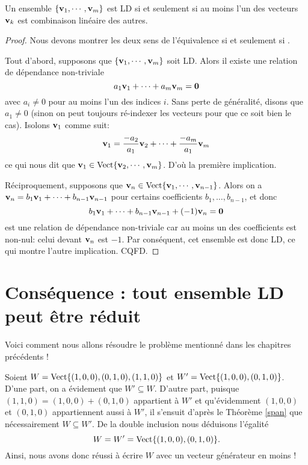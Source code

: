 \begin{theorem}\label{depspan} 
Un ensemble $\{\mathbf{v}_1, \cdots, \mathbf{v}_m\}$ est LD si et seulement si au moins
l'un des vecteurs $\mathbf{v}_k$ est combinaison lin\'eaire des autres.
\end{theorem}


\begin{proof}
Nous devons montrer les deux sens de l'\'equivalence \og si et seulement si \fg.

Tout d'abord, supposons que $\{\mathbf{v}_1, \cdots, \mathbf{v}_m\}$ soit LD.  Alors il existe
une relation de dépendance non-triviale
$$
a_1\mathbf{v}_1 + \cdots + a_m\mathbf{v}_m = \mathbf{0}
$$
avec $a_i \neq 0$ pour au moins l'un des indices $i$. Sans perte de généralité, disons que $a_1 \neq 0$ (sinon on peut toujours
r\'e-indexer les vecteurs pour que ce soit bien le cas).  Isolons $\mathbf{v}_1$ comme suit:
$$
\mathbf{v}_1 = \frac{-a_2}{a_1}\mathbf{v}_2 + \cdots + \frac{-a_m}{a_1}\mathbf{v}_m
$$
ce qui nous dit que $\mathbf{v}_1 \in \textrm{Vect}\{ \mathbf{v}_2, \cdots, \mathbf{v}_m\}$.   D'où la première implication.

R\'eciproquement, supposons que $\mathbf{v}_n \in \textrm{Vect}\{ \mathbf{v}_1, \cdots, \mathbf{v}_{n-1}\}$.
Alors on a $\mathbf{v}_n = b_1\mathbf{v}_1 + \cdots + b_{n-1}\mathbf{v}_{n-1}$ pour certains coefficients $b_1,\dots, b_{n-1}$, et donc
$$
b_1\mathbf{v}_1 + \cdots + b_{n-1}\mathbf{v}_{n-1} + (-1)\mathbf{v}_n = \mathbf{0}
$$ 
est une relation de dépendance non-triviale car au moins un des coefficients est non-nul: celui devant $\mathbf{v}_n$ est $-1$.  Par conséquent,  cet ensemble est donc LD, ce qui montre l'autre implication. CQFD.
\end{proof}


\section[R\'eduction d'ensembles LD]{Conséquence : tout ensemble LD peut être réduit}

Voici comment nous allons résoudre le problème mentionné dans les chapitres précédents !  

\begin{myexample} Soient $W = \textrm{Vect}\{ (1,0,0), (0,1,0), (1,1,0)\}$ et $W' = \textrm{Vect}\{ (1,0,0), (0,1,0)\}$. D'une part, on a évidement que $W'\subseteq W$. D'autre part, puisque 
$(1,1,0) = (1,0,0)+(0,1,0)$ appartient à $W'$ 
et qu'évidemment $(1,0,0)$ et $(0,1,0)$ appartiennent aussi à $W'$,
il s'ensuit d'après le Th\'eor\`eme \ref{span}
que nécessairement $W\subseteq W'$.
De la double inclusion nous déduisons l'égalité
$$
W = W' = \textrm{Vect}\{(1,0,0), (0,1,0)\}.
$$
Ainsi, nous avons donc réussi à écrire $W$ avec un vecteur générateur en moins !
\end{myexample}

